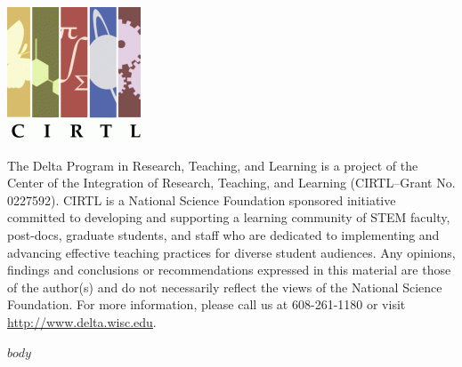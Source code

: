 \documentclass[12pt]{report} %
\begin{document}
\begin{titlepage}
\begin{center}
\includegraphics[scale=0.5]{images/cirtl.png}
\end{center}
{\tiny The Delta Program in Research, Teaching, and Learning is a project of the Center of the Integration of Research, Teaching, and Learning (CIRTL--Grant No. 0227592).  CIRTL is a National Science Foundation sponsored initiative committed to developing and supporting a learning community of STEM faculty, post-docs, graduate students, and staff who are dedicated to implementing  and advancing effective teaching practices for diverse student audiences.  Any opinions, findings and conclusions or recommendations expressed in this material are those of the author(s) and do not necessarily reflect the views of the National Science Foundation. For more information, please call us at 608-261-1180 or visit \url{http://www.delta.wisc.edu}. \par}
\end{titlepage}

\makeatletter
\let\ps@plain\ps@fancy 
\makeatother

\tableofcontents

\newpage
$body$
\end{document}
